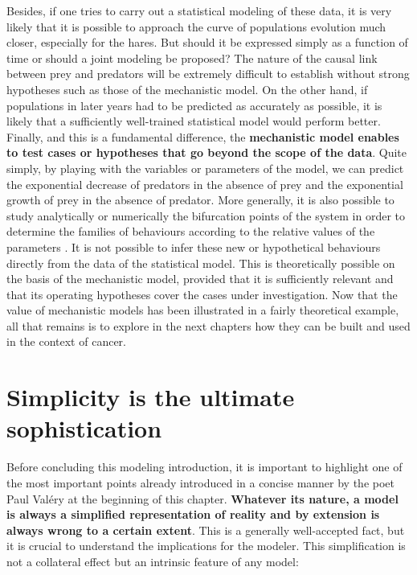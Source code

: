 \documentclass[a4paper,12pt,twoside,onecolumn,openright,final,oldfontcommands]{memoir}
\begin{document}
Besides, if one tries to carry out a statistical modeling of these data,
it is very likely that it is possible to approach the curve of
populations evolution much closer, especially for the hares. But should
it be expressed simply as a function of time or should a joint modeling
be proposed? The nature of the causal link between prey and predators
will be extremely difficult to establish without strong hypotheses such
as those of the mechanistic model. On the other hand, if populations in
later years had to be predicted as accurately as possible, it is likely
that a sufficiently well-trained statistical model would perform better.
Finally, and this is a fundamental difference, the \textbf{mechanistic
model enables to test cases or hypotheses that go beyond the scope of
the data}. Quite simply, by playing with the variables or parameters of
the model, we can predict the exponential decrease of predators in the
absence of prey and the exponential growth of prey in the absence of
predator. More generally, it is also possible to study analytically or
numerically the bifurcation points of the system in order to determine
the families of behaviours according to the relative values of the
parameters \citep{flake1998computational}. It is not possible to infer
these new or hypothetical behaviours directly from the data of the
statistical model. This is theoretically possible on the basis of the
mechanistic model, provided that it is sufficiently relevant and that
its operating hypotheses cover the cases under investigation. Now that
the value of mechanistic models has been illustrated in a fairly
theoretical example, all that remains is to explore in the next chapters
how they can be built and used in the context of cancer.

\section{Simplicity is the ultimate
sophistication}\label{simplicity-is-the-ultimate-sophistication}

Before concluding this modeling introduction, it is important to
highlight one of the most important points already introduced in a
concise manner by the poet Paul Valéry at the beginning of this chapter.
\textbf{Whatever its nature, a model is always a simplified
representation of reality and by extension is always wrong to a certain
extent}. This is a generally well-accepted fact, but it is crucial to
understand the implications for the modeler. This simplification is not
a collateral effect but an intrinsic feature of any model:
\end{document}
